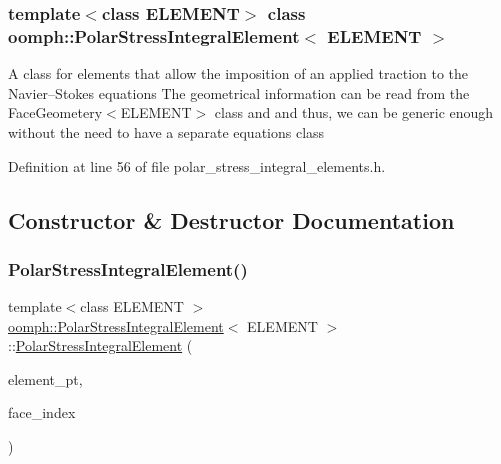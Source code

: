 \subsubsection*{template$<$class E\+L\+E\+M\+E\+NT$>$\newline
class oomph\+::\+Polar\+Stress\+Integral\+Element$<$ E\+L\+E\+M\+E\+N\+T $>$}

A class for elements that allow the imposition of an applied traction to the Navier--Stokes equations The geometrical information can be read from the Face\+Geometery$<$\+E\+L\+E\+M\+E\+N\+T$>$ class and and thus, we can be generic enough without the need to have a separate equations class 

Definition at line 56 of file polar\+\_\+stress\+\_\+integral\+\_\+elements.\+h.



\subsection{Constructor \& Destructor Documentation}
\mbox{\label{classoomph_1_1PolarStressIntegralElement_af36f7ba5ec7250370e99f378f183ba89}} 
\subsubsection{\texorpdfstring{Polar\+Stress\+Integral\+Element()}{PolarStressIntegralElement()}}
{\footnotesize\ttfamily template$<$class E\+L\+E\+M\+E\+NT $>$ \\
\hyperlink{classoomph_1_1PolarStressIntegralElement}{oomph\+::\+Polar\+Stress\+Integral\+Element}$<$ E\+L\+E\+M\+E\+NT $>$\+::\hyperlink{classoomph_1_1PolarStressIntegralElement}{Polar\+Stress\+Integral\+Element} (\begin{DoxyParamCaption}\item[{\hyperlink{classoomph_1_1FiniteElement}{Finite\+Element} $\ast$const \&}]{element\+\_\+pt,  }\item[{const int \&}]{face\+\_\+index }\end{DoxyParamCaption})\hspace{0.3cm}{\ttfamily [inline]}}


